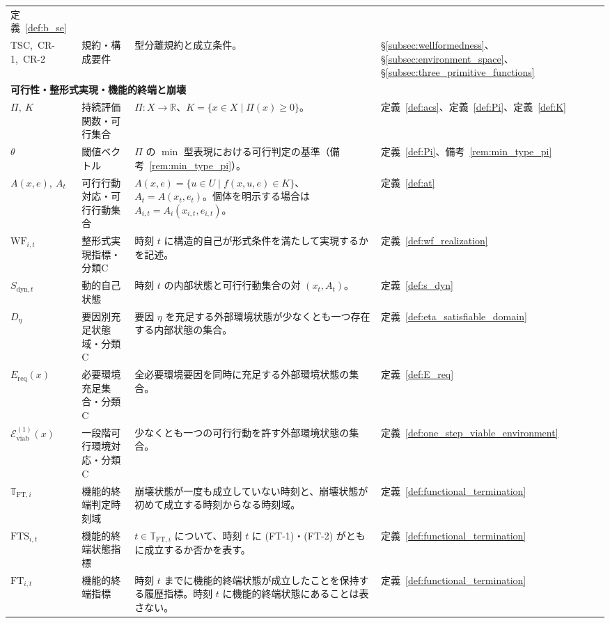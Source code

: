 \begin{longtable}{p{3.0cm} p{3.0cm} p{6.6cm} p{2.0cm}}
定義~\ref{def:b_se} \\[3pt]
TSC,\ CR-1,\ CR-2 & 規約・構成要件 &
型分離規約と成立条件。 &
\S\ref{subsec:wellformedness}、\S\ref{subsec:environment_space}、\S\ref{subsec:three_primitive_functions} \\[3pt]
\multicolumn{4}{l}{\textbf{可行性・整形式実現・機能的終端と崩壊}} \\[2pt]
$\Pi,\ K$ & 持続評価関数・可行集合 &
$\Pi:X\to\mathbb R$、$K=\{x\in X\mid\Pi(x)\ge0\}$。 &
定義~\ref{def:acs}、定義~\ref{def:Pi}、定義~\ref{def:K} \\[3pt]
$\theta$ & 閾値ベクトル &
$\Pi$ の $\min$ 型表現における可行判定の基準（備考~\ref{rem:min_type_pi}）。 &
定義~\ref{def:Pi}、備考~\ref{rem:min_type_pi} \\[3pt]
$A(x,e),\ A_t$ & 可行行動対応・可行行動集合 &
$A(x,e)=\{u\in U\mid f(x,u,e)\in K\}$、$A_t=A(x_t,e_t)$。個体を明示する場合は $A_{i,t}=A_i(x_{i,t},e_{i,t})$。 &
定義~\ref{def:at} \\[3pt]
$\mathrm{WF}_{i,t}$ & 整形式実現指標・分類C &
時刻 $t$ に構造的自己が形式条件を満たして実現するかを記述。 &
定義~\ref{def:wf_realization} \\[3pt]
$S_{\mathrm{dyn},t}$ & 動的自己状態 &
時刻 $t$ の内部状態と可行行動集合の対 $(x_t,A_t)$。 &
定義~\ref{def:s_dyn} \\[3pt]
$D_\eta$ & 要因別充足状態域・分類C &
要因 $\eta$ を充足する外部環境状態が少なくとも一つ存在する内部状態の集合。 &
定義~\ref{def:eta_satisfiable_domain} \\[3pt]
$E_{\mathrm{req}}(x)$ & 必要環境充足集合・分類C &
全必要環境要因を同時に充足する外部環境状態の集合。 &
定義~\ref{def:E_req} \\[3pt]
$\mathcal E_{\mathrm{viab}}^{(1)}(x)$ & 一段階可行環境対応・分類C &
少なくとも一つの可行行動を許す外部環境状態の集合。 &
定義~\ref{def:one_step_viable_environment} \\[3pt]
$\mathbb{T}_{\mathrm{FT},i}$ & 機能的終端判定時刻域 &
崩壊状態が一度も成立していない時刻と、崩壊状態が初めて成立する時刻からなる時刻域。 &
定義~\ref{def:functional_termination} \\[3pt]
$\mathrm{FTS}_{i,t}$ & 機能的終端状態指標 &
$t\in\mathbb{T}_{\mathrm{FT},i}$ について、時刻 $t$ に (FT-1)・(FT-2) がともに成立するか否かを表す。 &
定義~\ref{def:functional_termination} \\[3pt]
$\mathrm{FT}_{i,t}$ & 機能的終端指標 &
時刻 $t$ までに機能的終端状態が成立したことを保持する履歴指標。時刻 $t$ に機能的終端状態にあることは表さない。 &
定義~\ref{def:functional_termination} \\[3pt]

\end{longtable}
